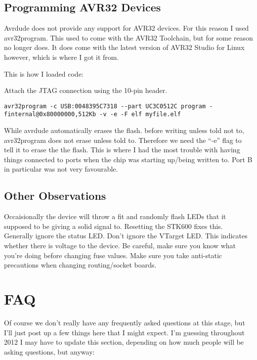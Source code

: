 \documentclass[a4paper, oneside, 11pt, titlepage, onecolumn, openright]{report}
\begin{document}
			
\section{Programming AVR32 Devices}
			\label{s:STK600AVR32Devices}
			Avrdude does not provide any support for AVR32 devices. For this reason I used avr32program. This used to come with the AVR32 Toolchain, but for some reason no longer does. It does come with the latest version of AVR32 Studio for Linux however, which is where I got it from.

			This is how I loaded code:\newline
			
			Attach the JTAG connection using the 10-pin header.
 						
\begin{lstlisting}[frame=trBL, breaklines=true]
avr32program -c USB:0048395C7318 --part UC3C0512C program -finternal@0x80000000,512Kb -v -e -F elf myfile.elf
\end{lstlisting}			
			 
			 While avrdude automatically erases the flash. before writing unless told not to, avr32program does not erase unless told to. Therefore we need the ``-e'' flag to tell it to erase the the flash.\newline
			 This is where I had the most trouble with having things connected to ports when the chip was starting up/being written to. Port B in particular was not very favourable.


\section{Other Observations}
			\label{s:STK600OtherObservations}			 
			 Occaisionally the device will throw a fit and randomly flash LEDs that it supposed to be giving a solid signal to. Resetting the STK600 fixes this. \newline
			 Generally ignore the status LED.\newline
			 Don't ignore the VTarget LED. This indicates whether there is voltage to the device.\newline
			 Be careful, make sure you know what you're doing before changing fuse values.\newline
			 Make sure you take anti-static precautions when changing routing/socket boards.
			 
\chapter{FAQ}
			\label{C:FAQ}
			Of course we don't really have any frequently asked questions at this stage, but I'll just post up a few things here that I might expect. I'm guessing throughout 2012 I may have to update this section, depending on how much people will be asking questions, but anyway:
			
\end{document}
